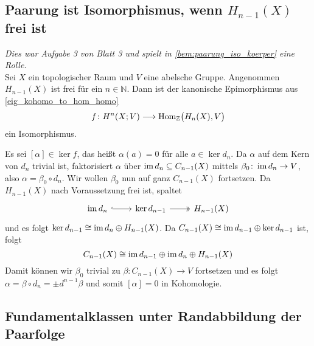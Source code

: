 \subsection{Paarung ist Isomorphismus, wenn $H_{n-1}(X)$ frei ist} %
\label{sub:paarung_isomorphismus_frei}
\emph{Dies war Aufgabe 3 von Blatt 3 und spielt in \autoref{bem:paarung_iso_koerper} eine Rolle.}\smallskip\\
Sei $X$ ein topologischer Raum und $V$ eine abelsche Gruppe.
Angenommen $H_{n-1}(X)$ ist frei für ein $n \in \mathbb{N}$.
Dann ist der kanonische Epimorphismus aus \autoref{eig_kohomo_to_hom_homo}
\[
	f \colon H^n(X;V) \longrightarrow \Hom_\mathbb{Z} \enbrace[\big]{H_n(X),V}
\]
ein Isomorphismus.
\begin{beweis}
	Es sei $[\alpha] \in \ker f$, das heißt $\alpha(a)=0$ für alle $a \in \ker d_n$.
	Da $\alpha$ auf dem Kern von $d_n$ trivial ist, faktorisiert $\alpha$ über $\im d_n \subseteq C_{n-1}(X)$ mittels $\beta_0 \colon \im d_n \to V$, also $\alpha = \beta_0 \circ d_n$.
	Wir wollen $\beta_0$ nun auf ganz $C_{n-1}(X)$ fortsetzen.
	Da $H_{n-1}(X)$ nach Voraussetzung frei ist, spaltet 
	\[
		\begin{tikzcd}
			\im d_n \rar[hook] & \ker d_{n-1} \rar[two heads] & H_{n-1}(X)
		\end{tikzcd}
	\]
	und es folgt $\ker d_{n-1} \cong \im d_n \oplus H_{n-1}(X)$.
	Da $C_{n-1}(X) \cong \im d_{n-1} \oplus \ker d_{n-1}$ ist, folgt
	\[
		C_{n-1}(X) \cong \im d_{n-1} \oplus \im d_n \oplus H_{n-1}(X)
	\]
	Damit können wir $\beta_0$ trivial zu $\beta \colon C_{n-1}(X) \to V$ fortsetzen und es folgt $\alpha= \beta \circ d_n = \pm d^{n-1} \beta$ und somit $[\alpha]=0$ in Kohomologie.
\end{beweis}

\subsection{Fundamentalklassen unter Randabbildung der Paarfolge} %
\label{sub:fundamentalklasse_rand}


